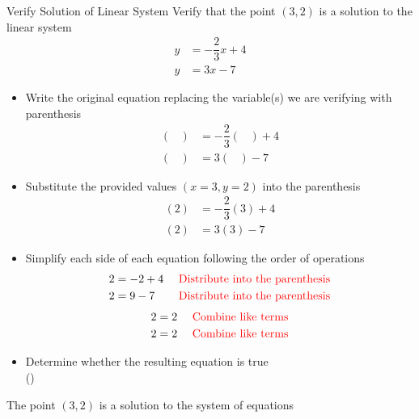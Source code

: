 \begin{example}{Verify Solution of Linear System}{}
    Verify that the point $(3,2)$ is a solution to the linear system
    \begin{align*}
        y&=-\dfrac{2}{3}x+4\\
        y&=3x-7
    \end{align*}    
    \begin{itemize}
	\item[] Write the original equation replacing the variable(s) we are verifying with parenthesis
        \begin{align*}
            \left(\;\;\;\right)&=-\dfrac{2}{3}\left(\;\;\;\right)+4\\
            \left(\;\;\;\right)&=3\left(\;\;\;\right)-7
        \end{align*}    
        \item[] Substitute the provided values $\left(x=3, y=2\right)$ into the parenthesis
        \begin{align*}
            (2)&=-\dfrac{2}{3}(3)+4\\
            (2)&=3(3)-7
        \end{align*}   
        \item[] Simplify each side of each equation following the order of operations
        \begin{align*}
            2&=-2+4&\textcolor{red}{\textrm{   Distribute into the parenthesis}}\\
            2&=9-7&\textcolor{red}{\textrm{   Distribute into the parenthesis}}
        \end{align*}   
         \begin{align*}
            2&=2&\textcolor{red}{\textrm{   Combine like terms}}\\
            2&=2&\textcolor{red}{\textrm{   Combine like terms}}
        \end{align*}  
            \item[]Determine whether the resulting equation is true\\
            (\true)
    \end{itemize}
    The point $(3,2)$ is a solution to the system of equations
\end{example}

